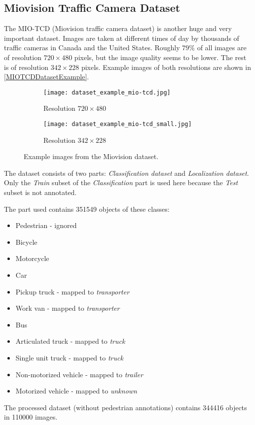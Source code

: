 \subsection{Miovision Traffic Camera Dataset}

The MIO-TCD (Miovision traffic camera dataset) \cite{MIO2018} is another huge
and very important dataset. Images are taken at different times of day by
thousands of traffic cameras in Canada and the United States. Roughly $79\%$ of
all images are of resolution $720 \times 480$ pixels, but the image quality
seems to be lower. The rest is of resolution $342 \times 228$ pixels. Example images of
both resolutions are shown in \autoref{MIOTCDDatasetExample}.

\begin{figure}[h]
    \centering
    \begin{subfigure}[b]{0.475\textwidth}
        \texttt{[image: dataset\_example\_mio-tcd.jpg]}
        \caption{Resolution $720 \times 480$}
    \end{subfigure}
    \begin{subfigure}[b]{0.475\textwidth}
        \texttt{[image: dataset\_example\_mio-tcd\_small.jpg]}
        \caption{Resolution $342 \times 228$}
    \end{subfigure}
    \caption{Example images from the Miovision dataset.}
    \label{MIOTCDDatasetExample}
\end{figure}

The dataset consists of two parts: \textit{Classification dataset} and
\textit{Localization dataset}. Only the \textit{Train} subset of the
\textit{Classification} part is used here because the \textit{Test} subset is
not annotated.

The part used contains \num{351549} objects of these classes:
\begin{itemize}
    \item Pedestrian - ignored
    \item Bicycle
    \item Motorcycle
    \item Car
    \item Pickup truck - mapped to \textit{transporter}
    \item Work van - mapped to \textit{transporter}
    \item Bus
    \item Articulated truck - mapped to \textit{truck}
    \item Single unit truck - mapped to \textit{truck}
    \item Non-motorized vehicle - mapped to \textit{trailer}
    \item Motorized vehicle - mapped to \textit{unknown}
\end{itemize}
The processed dataset (without pedestrian annotations) contains \num{344416}
objects in \num{110000} images.

